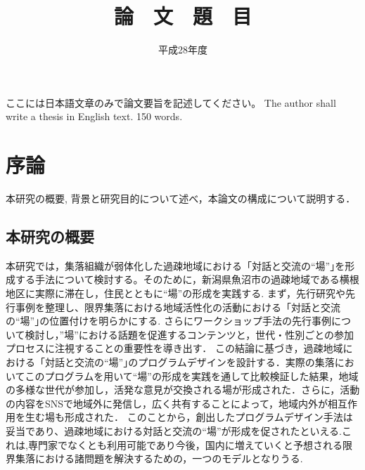 \documentclass[a4paper]{jsarticle}
\begin{document}
 \masterthesis


\title{論　文　題　目}
\date{平成28年度}
\maketitle


\setcounter{page}{1} %
ここには日本語文章のみで論文要旨を記述してください。
The author shall write a thesis in English text. 150 words.

\makemokuji


\newpage

\setcounter{page}{1} %
\section{序論}
本研究の概要, 背景と研究目的について述べ，本論文の構成について説明する．
\subsection{本研究の概要}
本研究では，集落組織が弱体化した過疎地域における「対話と交流の“場”｣を形成する手法について検討する。そのために，新潟県魚沼市の過疎地域である横根地区に実際に滞在し，住民とともに“場”の形成を実践する.
まず，先行研究や先行事例を整理し、限界集落における地域活性化の活動における「対話と交流の“場”｣の位置付けを明らかにする. さらにワークショップ手法の先行事例について検討し，”場”における話題を促進するコンテンツと，世代・性別ごとの参加プロセスに注視することの重要性を導き出す．
この結論に基づき，過疎地域における「対話と交流の“場”｣のプログラムデザインを設計する．実際の集落においてこのプログラムを用いて“場”の形成を実践を通して比較検証した結果，地域の多様な世代が参加し，活発な意見が交換される場が形成された．さらに，活動の内容をSNSで地域外に発信し，広く共有することによって，地域内外が相互作用を生む場も形成された．
このことから，創出したプログラムデザイン手法は妥当であり、過疎地域における対話と交流の“場”が形成を促されたといえる.これは,専門家でなくとも利用可能であり今後，国内に増えていくと予想される限界集落における諸問題を解決するための，一つのモデルとなりうる.
\end{document}
